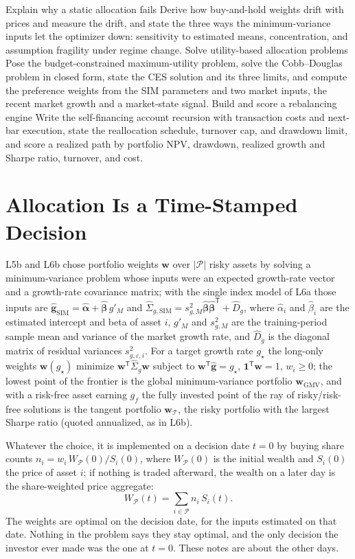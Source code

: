 \documentclass[11pt]{article}
\newcommand{\np}{|\mathcal P|}
\newcommand{\bw}{\mathbf w}
\newcommand{\bg}{\mathbf g}
\newcommand{\bal}{\boldsymbol\alpha}
\newcommand{\bbe}{\boldsymbol\beta}
\newcommand{\Tan}{\mathcal T}
\newcommand{\WP}{W_{\mathcal P}}
\newcommand{\SigSIM}{\hat\Sigma_{g,\mathrm{SIM}}}
\newcommand{\gSIM}{\hat{\bg}_{\mathrm{SIM}}}
\begin{document}

\learningobjectives
  {Explain why a static allocation fails}
  {Derive how buy-and-hold weights drift with prices and measure the drift, and state the three ways the minimum-variance inputs let the optimizer down: sensitivity to estimated means, concentration, and assumption fragility under regime change.}
  {Solve utility-based allocation problems}
  {Pose the budget-constrained maximum-utility problem, solve the Cobb--Douglas problem in closed form, state the CES solution and its three limits, and compute the preference weights from the SIM parameters and two market inputs, the recent market growth and a market-state signal.}
  {Build and score a rebalancing engine}
  {Write the self-financing account recursion with transaction costs and next-bar execution, state the reallocation schedule, turnover cap, and drawdown limit, and score a realized path by portfolio NPV, drawdown, realized growth and Sharpe ratio, turnover, and cost.}

\section{Allocation Is a Time-Stamped Decision}

L5b and L6b chose portfolio weights $\bw$ over $\np$ risky assets by solving a minimum-variance problem whose inputs were an expected growth-rate vector and a growth-rate covariance matrix; with the single index model of L6a those inputs are $\gSIM=\hat{\bal}+\hat{\bbe}\,g'_M$ and $\SigSIM=s^2_{g,M}\hat{\bbe}\hat{\bbe}^{\mathsf T}+\hat D_g$, where $\hat\alpha_i$ and $\hat\beta_i$ are the estimated intercept and beta of asset $i$, $g'_M$ and $s^2_{g,M}$ are the training-period sample mean and variance of the market growth rate, and $\hat D_g$ is the diagonal matrix of residual variances $s^2_{g,\varepsilon,i}$. For a target growth rate $g_\star$ the long-only weights $\bw(g_\star)$ minimize $\bw^{\mathsf T}\hat\Sigma_g\bw$ subject to $\bw^{\mathsf T}\hat{\bg}=g_\star$, $\mathbf 1^{\mathsf T}\bw=1$, $w_i\ge0$; the lowest point of the frontier is the global minimum-variance portfolio $\bw_{\mathrm{GMV}}$, and with a risk-free asset earning $g_f$ the fully invested point of the ray of risky/risk-free solutions is the tangent portfolio $\bw_{\Tan}$, the risky portfolio with the largest Sharpe ratio (quoted annualized, as in L6b).

Whatever the choice, it is implemented on a decision date $t=0$ by buying share counts $n_i=w_i\,\WP(0)/S_i(0)$, where $\WP(0)$ is the initial wealth and $S_i(0)$ the price of asset $i$; if nothing is traded afterward, the wealth on a later day is the share-weighted price aggregate:
\begin{equation}
  \label{eq:buy-and-hold}
  \WP(t)=\sum_{i\in\mathcal P}n_i\,S_i(t).
\end{equation}
The weights are optimal on the decision date, for the inputs estimated on that date. Nothing in the problem says they stay optimal, and the only decision the investor ever made was the one at $t=0$. These notes are about the other days.
\end{document}
